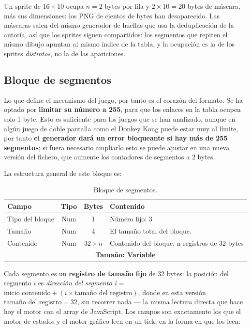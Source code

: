 Un sprite de $16 \times 10$ ocupa $n = 2$ bytes por fila y
$2 \times 10 = 20$ bytes de máscara, más sus dimensiones: los PNG
de cientos de bytes han desaparecido. Las máscaras salen del mismo
generador de huellas que usa la deduplicación de la autoría, así
que los sprites siguen compartidos: los segmentos que repiten el
mismo dibujo apuntan al mismo índice de la tabla, y la ocupación es
la de los sprites \emph{distintos}, no la de las apariciones.

\subsection{Bloque de segmentos}
\label{sec:A02GWCBlSegmentos}

Lo que define el mecanismo del juego, por tanto es el corazón del formato. Se ha optado por \textbf{limitar su número a 255}, para que los enlaces en la tabla ocupen solo 1 byte. Esto es suficiente para los juegos que se han analizado, aunque en algún juego de doble pantalla como el Donkey Kong puede estar muy al límite, por tanto \textbf{el generador dará un error bloqueante si hay más de 255 segmentos}; si fuera necesario ampliarlo esto se puede ajustar en una nueva versión del fichero, que aumente los contadores de segmentos a 2 bytes.

La estructura general de este bloque es:

\begin{table}[H]
	\centering
	\begin{tabular}{|l|c|c|p{8.4cm}|}
		\hline
		\textbf{Campo} & \textbf{Tipo} & \textbf{Bytes} & \textbf{Contenido} \\
		\hline
		
		Tipo del bloque & Num & 1 & Número fijo: 3\\ \hline
		
		Tamaño & Num & 4 & El tamaño total del bloque. \\ \hline
		
		Contenido & Num & $32 \times n$ & Contenido del bloque, n registros de 32 bytes\\
		
		\hline\hline
		\multicolumn{4}{c}{\textbf{Tamaño: Variable}} \\ \hline
	\end{tabular}
	\caption{Bloque de segmentos.}
	\label{tab:A02BlSegmentos}
\end{table}

Cada segmento es un \textbf{registro de tamaño fijo} de 32 bytes: la posición del segmento
$i$ es \emph{dirección del segmento i} = $\text{inicio contenido} + (i \times \text{tamaño del registro})$, donde en esta versión $\text{tamaño del registro} = 32$, sin
recorrer nada — la misma lectura directa que hace hoy el motor con el array
de JavaScript. Los campos son exactamente los que el motor de estados y el
motor gráfico leen en un tick, en la forma en que los leen:

